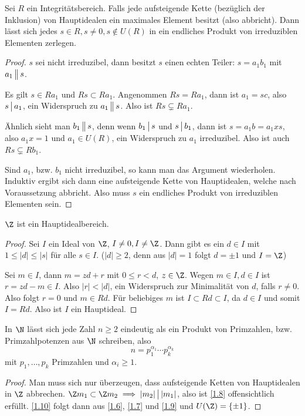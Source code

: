 \begin{lem} \label{1.8}
	Sei $R$ ein Integritätsbereich.
	Falls jede aufsteigende Kette (bezüglich der Inklusion) von Hauptidealen ein maximales Element besitzt (also abbricht).
	Dann lässt sich jedes $s \in R, s \neq 0, s \not \in U(R)$ in ein endliches Produkt von irreduziblen Elementen zerlegen.
	\begin{proof}
		$s$ sei nicht irreduzibel, dann besitzt $s$ einen echten Teiler: $s = a_1 b_1$ mit $a_1 \divs*  s$.

		Es gilt $s \in Ra_1$ und $Rs \subset Ra_1$.
		Angenommen $Rs = Ra_1$, dann ist $a_1 = s c$, also $s \divs  a_1$, ein Widerspruch zu $a_1 \divs*  s$.
		Also ist $Rs \subsetneq Ra_1$.

		Ähnlich sieht man $b_1 \divs*  s$, denn wenn $b_1 \divs  s$ und $s \divs  b_1$, dann ist $s = a_1 b = a_1 x s$, also $a_1 x = 1$ und $a_1 \in U(R)$, ein Widerspruch zu $a_1$ irreduzibel.
		Also ist auch $Rs \subsetneq Rb_1$.

		Sind $a_1$, bzw. $b_1$ nicht irreduzibel, so kann man das Argument wiederholen.
		Induktiv ergibt sich dann eine aufsteigende Kette von Hauptidealen, welche nach Voraussetzung abbricht.
		Also muss $s$ ein endliches Produkt von irreduziblen Elementen sein.
	\end{proof}
\end{lem}

\begin{lem} \label{1.9}
	$\Z$ ist ein Hauptidealbereich.
	\begin{proof}
		Sei $I$ ein Ideal von $\Z$, $I \neq 0, I \neq \Z$.
		Dann gibt es ein $d \in I$ mit $1 \le |d| \le |s|$ für alle $s \in I$.
		($|d| \ge 2$, denn aus $|d|=1$ folgt $d = \pm 1$ und $I = \Z$)

		Sei $m \in I$, dann $m = zd + r$ mit $0 \le r < d$, $z \in \Z$.
		Wegen $m \in I, d\in I$ ist $r = zd - m \in I$.
		Also $|r| < |d|$, ein Widerspruch zur Minimalität von $d$, falls $r \neq 0$.
		Also folgt $r = 0$ und $m \in Rd$.
		Für beliebiges $m$ ist $I \subset Rd \subset I$, da $d \in I$ und somit $I = Rd$.
		Also ist $I$ ein Hauptideal.
	\end{proof}
\end{lem}

\begin{st} \label{1.10}
	In $\N$ lässt sich jede Zahl $n \ge 2$ eindeutig als ein Produkt von Primzahlen, bzw. Primzahlpotenzen aus $\N$ schreiben, also
	\[
		n = p_1^{\alpha_1} \dotsb p_k^{\alpha_k}
	\]
	mit $p_1, \dotsc, p_k$ Primzahlen und $\alpha_i \ge 1$.
	\begin{proof}
		Man muss sich nur überzeugen, dass aufsteigende Ketten von Hauptidealen in $\Z$ abbrechen.
		$\Z m_1 \subset \Z m_2 \implies |m_2| \divs  |m_1|$, also ist \ref{1.8} offensichtlich erfüllt. 
		\ref{1.10} folgt dann aus \ref{1.6}, \ref{1.7} und \ref{1.9} und $U(\Z) = \{ \pm 1 \}$.
	\end{proof}
\end{st}

